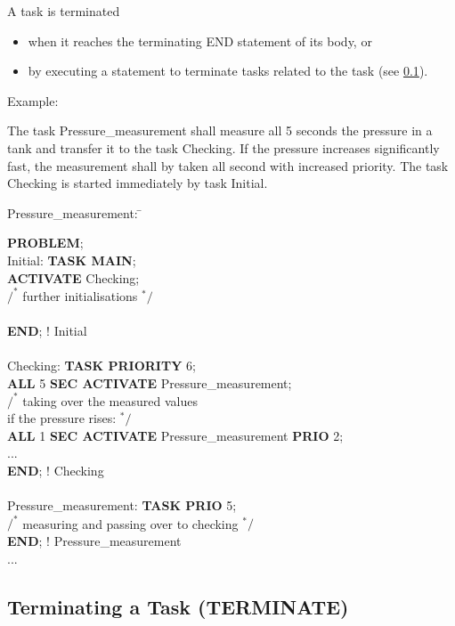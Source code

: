 A task is terminated
\begin{itemize}
\item when it reaches the terminating END statement of its body, or
\item by executing a statement to terminate tasks related to the task
(see \ref{sec_terminate}).
\end{itemize}

Example:

The task Pressure\_measurement shall measure all 5 seconds the pressure in a tank and transfer it to the task Checking. If the pressure increases significantly fast, the measurement shall by taken all second with increased priority. The task Checking is started immediately by task Initial.

\begin{tabbing}
\x Pressure\_measurement: \= \kill

{\bf PROBLEM}; \> \\
\x Initial:    \> {\bf TASK MAIN};\\
        \> {\bf ACTIVATE} Checking;\\
        \> \x $/^*$ further initialisations $^*/$ \\
        \> \\
        \> {\bf END}; ! Initial\\
        \> \\
\x Checking:   \> {\bf TASK PRIORITY} 6;\\
        \> {\bf ALL} 5 {\bf SEC ACTIVATE} Pressure\_measurement;\\
        \> \x $/^*$ taking over the measured values\\
        \> \x if the pressure rises: $^*/$\\
        \> {\bf ALL} 1 {\bf SEC ACTIVATE} Pressure\_measurement {\bf PRIO} 2;\\
        \> ...\\
        \> {\bf END}; ! Checking\\
        \> \\
\x Pressure\_measurement: \> {\bf TASK PRIO} 5;\\
    \> $/^*$ measuring and passing over to checking $^*/$\\
    \> {\bf END}; ! Pressure\_measurement\\
\x ... \>
\end{tabbing}



\subsection{Terminating a Task (TERMINATE)}    %
\label{sec_terminate}

